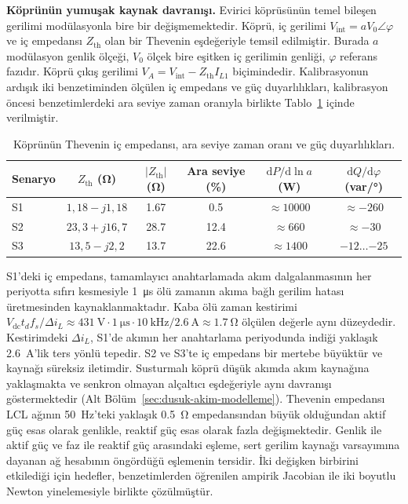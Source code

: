\textbf{Köprünün yumuşak kaynak davranışı.} Evirici köprüsünün temel bileşen gerilimi modülasyonla bire bir değişmemektedir. Köprü, iç gerilimi $V_{\mathrm{int}}=aV_0\angle\varphi$ ve iç empedansı $Z_{\mathrm{th}}$ olan bir Thevenin eşdeğeriyle temsil edilmiştir. Burada $a$ modülasyon genlik ölçeği, $V_0$ ölçek bire eşitken iç gerilimin genliği, $\varphi$ referans fazıdır. Köprü çıkış gerilimi $V_A=V_{\mathrm{int}}-Z_{\mathrm{th}}I_{L1}$ biçimindedir. Kalibrasyonun ardışık iki benzetiminden ölçülen iç empedans ve güç duyarlılıkları, kalibrasyon öncesi benzetimlerdeki ara seviye zaman oranıyla birlikte Tablo~\ref{tab:kopru-ic-empedansi} içinde verilmiştir.

\begin{table}[H]
  \centering
  \caption{Köprünün Thevenin iç empedansı, ara seviye zaman oranı ve güç duyarlılıkları.}
  \label{tab:kopru-ic-empedansi}
  \small
  \setlength{\tabcolsep}{4pt}
  \begin{tabular}{l c c c c c}
    \toprule
    Senaryo & $Z_{\mathrm{th}}$ (\si{\ohm}) & $|Z_{\mathrm{th}}|$ (\si{\ohm}) & Ara seviye (\%) & $\mathrm{d}P/\mathrm{d}\ln a$ (\si{\watt}) & $\mathrm{d}Q/\mathrm{d}\varphi$ (var/\si{\degree}) \\
    \midrule
    S1 & $1{,}18-j1{,}18$ & \num{1.67} & \num{0.5} & $\approx\num{10000}$ & $\approx-260$ \\
    S2 & $23{,}3+j16{,}7$ & \num{28.7} & \num{12.4} & $\approx\num{660}$ & $\approx-30$ \\
    S3 & $13{,}5-j2{,}2$ & \num{13.7} & \num{22.6} & $\approx\num{1400}$ & $-12\ldots{-25}$ \\
    \bottomrule
  \end{tabular}
\end{table}

S1'deki iç empedans, tamamlayıcı anahtarlamada akım dalgalanmasının her periyotta sıfırı kesmesiyle \SI{1}{\micro\second} ölü zamanın akıma bağlı gerilim hatası üretmesinden kaynaklanmaktadır. Kaba ölü zaman kestirimi $V_{\mathrm{dc}}t_df_s/\Delta i_L\approx\SI{431}{\volt}\cdot\SI{1}{\micro\second}\cdot\SI{10}{\kilo\hertz}/\SI{2.6}{\ampere}\approx\SI{1.7}{\ohm}$ ölçülen değerle aynı düzeydedir. Kestirimdeki $\Delta i_L$, S1'de akımın her anahtarlama periyodunda indiği yaklaşık \SI{2.6}{\ampere}'lik ters yönlü tepedir. S2 ve S3'te iç empedans bir mertebe büyüktür ve kaynağı süreksiz iletimdir. Susturmalı köprü düşük akımda akım kaynağına yaklaşmakta ve senkron olmayan alçaltıcı eşdeğeriyle aynı davranışı göstermektedir (Alt Bölüm~\ref{sec:dusuk-akim-modelleme}). Thevenin empedansı LCL ağının \SI{50}{\hertz}'teki yaklaşık \SI{0.5}{\ohm} empedansından büyük olduğundan aktif güç esas olarak genlikle, reaktif güç esas olarak fazla değişmektedir. Genlik ile aktif güç ve faz ile reaktif güç arasındaki eşleme, sert gerilim kaynağı varsayımına dayanan ağ hesabının öngördüğü eşlemenin tersidir. İki değişken birbirini etkilediği için hedefler, benzetimlerden öğrenilen ampirik Jacobian ile iki boyutlu Newton yinelemesiyle birlikte çözülmüştür.


